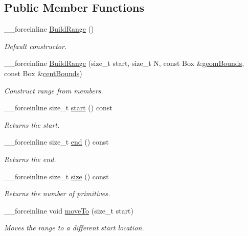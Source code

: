 \subsection*{Public Member Functions}
\begin{DoxyCompactItemize}
\item 
\_\-\_\-forceinline \hyperlink{structembree_1_1_build_range_a0326a94b8cf4024d0f5489ba77e0057c}{BuildRange} ()
\begin{DoxyCompactList}\small\item\em Default constructor. \item\end{DoxyCompactList}\item 
\_\-\_\-forceinline \hyperlink{structembree_1_1_build_range_ab24ae43f6abdbb30b01cb4552b3c45c9}{BuildRange} (size\_\-t start, size\_\-t N, const Box \&\hyperlink{structembree_1_1_build_range_a08845e5503dde4f26585423c3fc623c8}{geomBounds}, const Box \&\hyperlink{structembree_1_1_build_range_a988222440926b9ff9035a53762199c75}{centBounds})
\begin{DoxyCompactList}\small\item\em Construct range from members. \item\end{DoxyCompactList}\item 
\_\-\_\-forceinline size\_\-t \hyperlink{structembree_1_1_build_range_a3092b5cc10f2d1cf2c97ab79ccb68ae5}{start} () const 
\begin{DoxyCompactList}\small\item\em Returns the start. \item\end{DoxyCompactList}\item 
\_\-\_\-forceinline size\_\-t \hyperlink{structembree_1_1_build_range_a55862ebd1c80916945e07bc34d756074}{end} () const 
\begin{DoxyCompactList}\small\item\em Returns the end. \item\end{DoxyCompactList}\item 
\_\-\_\-forceinline size\_\-t \hyperlink{structembree_1_1_build_range_a5eaf9793776fd1957ee18cab77408f99}{size} () const 
\begin{DoxyCompactList}\small\item\em Returns the number of primitives. \item\end{DoxyCompactList}\item 
\_\-\_\-forceinline void \hyperlink{structembree_1_1_build_range_aaa37afe4037b28096ba75431474a20eb}{moveTo} (size\_\-t start)
\begin{DoxyCompactList}\small\item\em Moves the range to a different start location. \item\end{DoxyCompactList}\end{DoxyCompactItemize}
